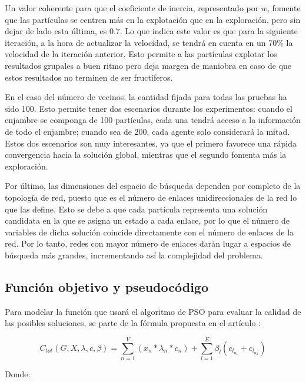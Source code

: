 Un valor coherente para que el coeficiente de inercia, representado por $w$, fomente que las partículas se centren más en la explotación que en la exploración, pero sin dejar de lado esta última, es 0.7. Lo que indica este valor es que para la siguiente iteración, a la hora de actualizar la velocidad, se tendrá en cuenta en un 70\% la velocidad de la iteración anterior. Esto permite a las partículas explotar los resultados grupales a buen ritmo pero deja margen de maniobra en caso de que estos resultados no terminen de ser fructíferos.

En el caso del número de vecinos, la cantidad fijada para todas las pruebas ha sido 100. Esto permite tener dos escenarios durante los experimentos: cuando el enjambre se componga de 100 partículas, cada una tendrá acceso a la información de todo el enjambre; cuando sea de 200, cada agente solo considerará la mitad. Estos dos escenarios son muy interesantes, ya que el primero favorece una rápida convergencia hacia la solución global, mientras que el segundo fomenta más la exploración.

Por último, las dimensiones del espacio de búsqueda dependen por completo de la topología de red, puesto que es el número de enlaces unidireccionales de la red lo que las define. Esto se debe a que cada partícula representa una solución candidata en la que se asigna un estado a cada enlace, por lo que el número de variables de dicha solución coincide directamente con el número de enlaces de la red. Por lo tanto, redes con mayor número de enlaces darán lugar a espacios de búsqueda más grandes, incrementando así la complejidad del problema.

\subsection{Función objetivo y pseudocódigo}

Para modelar la función que usará el algoritmo de PSO para evaluar la calidad de las posibles soluciones, se parte de la fórmula propuesta en el artículo \cite{ElZahr2023}:

\begin{equation}
    C_{tot}(G, X, \lambda, c, \beta) = \sum_{n=1}^{V} (x_n * \lambda_n * c_n) + \sum_{l=1}^{E} \beta_l (c_{l_{n_1}} + c_{l_{n_2}})
\end{equation}

Donde:

